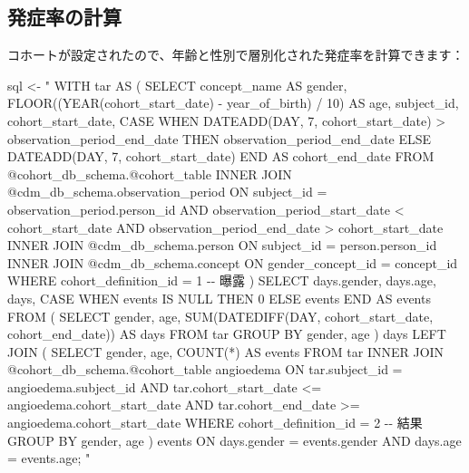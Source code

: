 \documentclass[
  11pt]{book}
\newenvironment{Shaded}{\begin{snugshade}}{\end{snugshade}}
\newcommand{\NormalTok}[1]{#1}
\newcommand{\OtherTok}[1]{\textcolor[rgb]{0.56,0.35,0.01}{#1}}
\newcommand{\StringTok}[1]{\textcolor[rgb]{0.31,0.60,0.02}{#1}}
\theoremstyle{definition}
\theoremstyle{definition}
\theoremstyle{definition}
\theoremstyle{definition}
\theoremstyle{remark}
\begin{document}
\subsection{発症率の計算}\label{ux767aux75c7ux7387ux306eux8a08ux7b97}

コホートが設定されたので、年齢と性別で層別化された発症率を計算できます：

\begin{Shaded}
\begin{Highlighting}[]
\NormalTok{sql }\OtherTok{\textless{}{-}} \StringTok{"}
\StringTok{WITH tar AS (}
\StringTok{  SELECT concept\_name AS gender,}
\StringTok{    FLOOR((YEAR(cohort\_start\_date) {-}}
\StringTok{          year\_of\_birth) / 10) AS age,}
\StringTok{    subject\_id,}
\StringTok{    cohort\_start\_date,}
\StringTok{    CASE WHEN DATEADD(DAY, 7, cohort\_start\_date) \textgreater{}}
\StringTok{      observation\_period\_end\_date}
\StringTok{    THEN observation\_period\_end\_date}
\StringTok{    ELSE DATEADD(DAY, 7, cohort\_start\_date)}
\StringTok{    END AS cohort\_end\_date}
\StringTok{  FROM @cohort\_db\_schema.@cohort\_table}
\StringTok{  INNER JOIN @cdm\_db\_schema.observation\_period}
\StringTok{    ON subject\_id = observation\_period.person\_id}
\StringTok{      AND observation\_period\_start\_date \textless{} cohort\_start\_date}
\StringTok{      AND observation\_period\_end\_date \textgreater{} cohort\_start\_date}
\StringTok{  INNER JOIN @cdm\_db\_schema.person}
\StringTok{    ON subject\_id = person.person\_id}
\StringTok{  INNER JOIN @cdm\_db\_schema.concept}
\StringTok{    ON gender\_concept\_id = concept\_id}
\StringTok{  WHERE cohort\_definition\_id = 1 {-}{-} 曝露}
\StringTok{)}
\StringTok{SELECT days.gender,}
\StringTok{    days.age,}
\StringTok{    days,}
\StringTok{    CASE WHEN events IS NULL THEN 0 ELSE events END AS events}
\StringTok{FROM (}
\StringTok{  SELECT gender,}
\StringTok{    age,}
\StringTok{    SUM(DATEDIFF(DAY, cohort\_start\_date,}
\StringTok{      cohort\_end\_date)) AS days}
\StringTok{  FROM tar}
\StringTok{  GROUP BY gender,}
\StringTok{    age}
\StringTok{) days}
\StringTok{LEFT JOIN (}
\StringTok{  SELECT gender,}
\StringTok{      age,}
\StringTok{      COUNT(*) AS events}
\StringTok{  FROM tar}
\StringTok{  INNER JOIN @cohort\_db\_schema.@cohort\_table angioedema}
\StringTok{    ON tar.subject\_id = angioedema.subject\_id}
\StringTok{      AND tar.cohort\_start\_date \textless{}= angioedema.cohort\_start\_date}
\StringTok{      AND tar.cohort\_end\_date \textgreater{}= angioedema.cohort\_start\_date}
\StringTok{  WHERE cohort\_definition\_id = 2 {-}{-} 結果}
\StringTok{  GROUP BY gender,}
\StringTok{    age}
\StringTok{) events}
\StringTok{ON days.gender = events.gender}
\StringTok{  AND days.age = events.age;}
\StringTok{"}


\end{Highlighting}
\end{Shaded}
\end{document}
